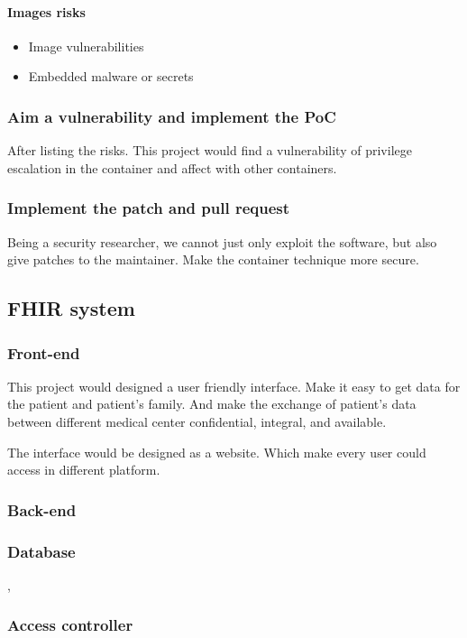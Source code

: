 \documentclass[12pt,a4paper]{IEEEconf}
\begin{document}
\paragraph{Images risks}
\begin{itemize}
  \item Image vulnerabilities
  \item Embedded malware or secrets
\end{itemize}

\subsubsection{Aim a vulnerability and implement the PoC}
After listing the risks. This project would find a vulnerability of privilege escalation in
the container and affect with other containers.

\subsubsection{Implement the patch and pull request}
Being a security researcher, we cannot just only exploit the software, but also give patches to
the maintainer. Make the container technique more secure.

\subsection{FHIR system}
\subsubsection{Front-end}
This project would designed a user friendly interface. Make it easy to get data for the
patient and patient's family. And make the exchange of patient's data between different medical
center confidential, integral, and available.

The interface would be designed as a website. Which make every user could access in different platform.

\subsubsection{Back-end}
\subsubsection{Database},
\subsubsection{Access controller}
\end{document}
